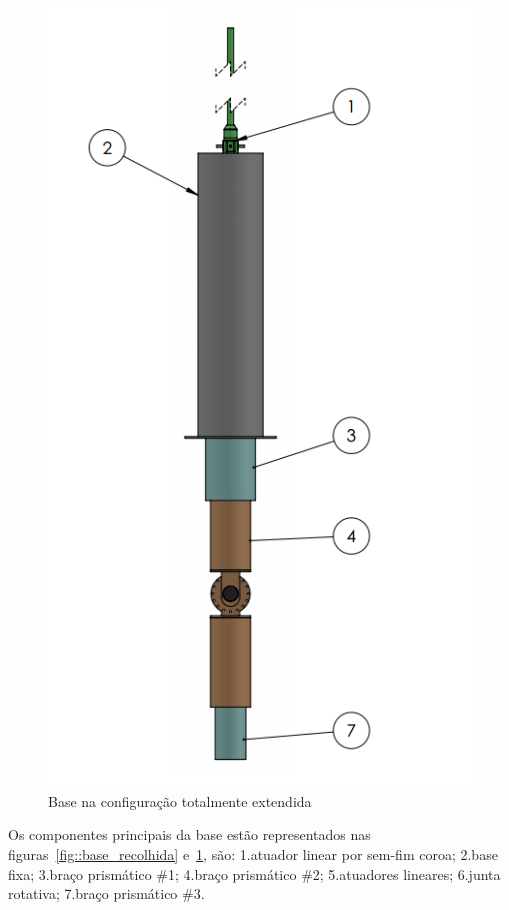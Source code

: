 \begin{figure}[h!]
\centering
	\includegraphics[width=\columnwidth]{figs/estudo/solid/base_extendida.png} 
	\caption{Base na configuração totalmente extendida}
	\label{fig::base_extendida}
\end{figure}

Os componentes principais da base estão representados nas
figuras~\ref{fig::base_recolhida} e~\ref{fig::base_extendida}, são: 1.atuador
linear por sem-fim coroa; 2.base fixa; 3.braço prismático \#1; 4.braço
prismático \#2; 5.atuadores lineares; 6.junta rotativa; 7.braço prismático \#3.

